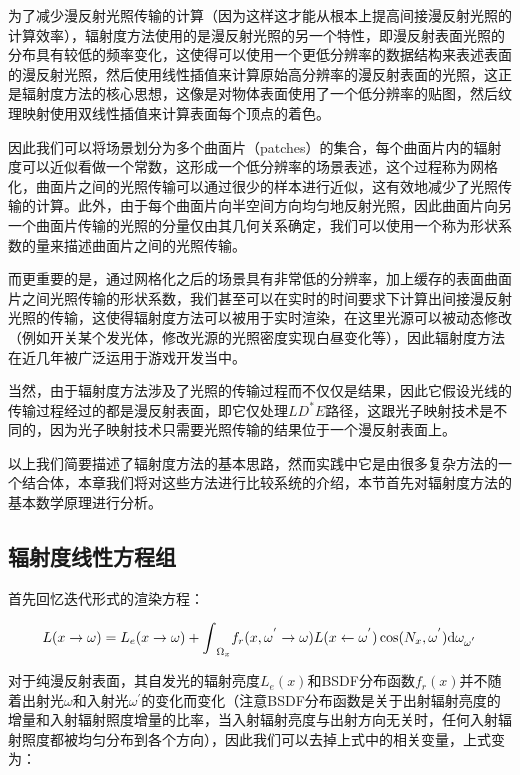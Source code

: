 为了减少漫反射光照传输的计算（因为这样这才能从根本上提高间接漫反射光照的计算效率），辐射度方法使用的是漫反射光照的另一个特性，即漫反射表面光照的分布具有较低的频率变化，这使得可以使用一个更低分辨率的数据结构来表述表面的漫反射光照，然后使用线性插值来计算原始高分辨率的漫反射表面的光照，这正是辐射度方法的核心思想，这像是对物体表面使用了一个低分辨率的贴图，然后纹理映射使用双线性插值来计算表面每个顶点的着色。

因此我们可以将场景划分为多个曲面片（patches）的集合，每个曲面片内的辐射度可以近似看做一个常数，这形成一个低分辨率的场景表述，这个过程称为网格化，曲面片之间的光照传输可以通过很少的样本进行近似，这有效地减少了光照传输的计算。此外，由于每个曲面片向半空间方向均匀地反射光照，因此曲面片向另一个曲面片传输的光照的分量仅由其几何关系确定，我们可以使用一个称为形状系数的量来描述曲面片之间的光照传输。

而更重要的是，通过网格化之后的场景具有非常低的分辨率，加上缓存的表面曲面片之间光照传输的形状系数，我们甚至可以在实时的时间要求下计算出间接漫反射光照的传输，这使得辐射度方法可以被用于实时渲染，在这里光源可以被动态修改（例如开关某个发光体，修改光源的光照密度实现白昼变化等），因此辐射度方法在近几年被广泛运用于游戏开发当中。

当然，由于辐射度方法涉及了光照的传输过程而不仅仅是结果，因此它假设光线的传输过程经过的都是漫反射表面，即它仅处理$LD^{*}E$路径，这跟光子映射技术是不同的，因为光子映射技术只需要光照传输的结果位于一个漫反射表面上。

以上我们简要描述了辐射度方法的基本思路，然而实践中它是由很多复杂方法的一个结合体，本章我们将对这些方法进行比较系统的介绍，本节首先对辐射度方法的基本数学原理进行分析。





\subsection{辐射度线性方程组}
首先回忆迭代形式的渲染方程：

\begin{equation}
	L(x\to{\omega})=L_e(x\to{\omega})+{\rm \int}_{\Omega_x}f_r(x,{\omega}^{'}\to{\omega})L(x\leftarrow{\omega}^{'})\cos(N_x,{\omega}^{'}){\rm d}\omega_{{\omega}^{'}}
\end{equation}

对于纯漫反射表面，其自发光的辐射亮度$L_e(x)$和BSDF分布函数$f_r(x)$并不随着出射光${\omega}$和入射光${\omega}^{'}$的变化而变化（注意BSDF分布函数是关于出射辐射亮度的增量和入射辐射照度增量的比率，当入射辐射亮度与出射方向无关时，任何入射辐射照度都被均匀分布到各个方向），因此我们可以去掉上式中的相关变量，上式变为：

